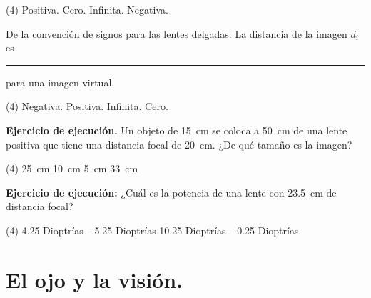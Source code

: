 \documentclass[12pt, letter]{exam}
\begin{document}
\begin{questions}
    \begin{tasks}(4)
        \task Positiva.
        \task Cero.
        \task Infinita.
        \task Negativa.
    \end{tasks}
    \question De la convención de signos para las lentes delgadas:  La distancia de la imagen $d_{i}$ es \rule{2cm}{0.1mm} para una imagen virtual.
    \begin{tasks}(4)
        \task Negativa.
        \task Positiva.
        \task Infinita.
        \task Cero.
    \end{tasks}
    \question \label{Problema_02} \textbf{Ejercicio de ejecución. } Un objeto de \SI{15}{\centi\meter} se coloca a \SI{50}{\centi\meter} de una lente positiva que tiene una distancia focal de \SI{20}{\centi\meter}. ¿De qué tamaño es la imagen?
    \begin{tasks}(4)
        \task \SI{25}{\centi\meter}
        \task \SI{10}{\centi\meter}
        \task \SI{5}{\centi\meter}
        \task \SI{33}{\centi\meter}
    \end{tasks}
    \question \label{Problema_03} \textbf{Ejercicio de ejecución: } ¿Cuál es la potencia de una lente con \SI{23.5}{\centi\meter} de distancia focal?
    \begin{tasks}(4)
        \task \num{4.25} Dioptrías
        \task \num{-5.25} Dioptrías
        \task \num{10.25} Dioptrías
        \task \num{-0.25} Dioptrías
    \end{tasks}

    \section{El ojo y la visión.}


\end{questions}
\end{document}
